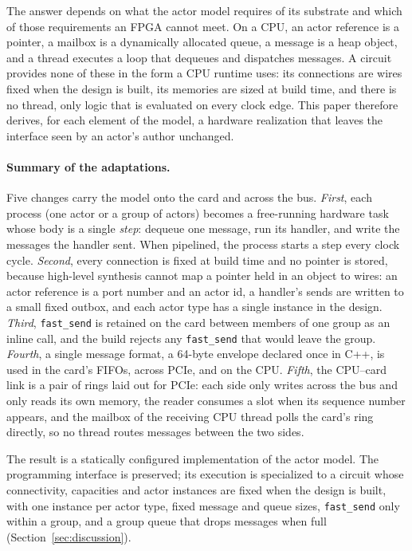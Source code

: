 \documentclass[11pt]{article}
\newcommand{\fs}{\texttt{fast\_send}}
\begin{document}
The answer depends on what the actor model requires of its substrate and which
of those requirements an FPGA cannot meet. On a CPU, an actor reference is a
pointer, a mailbox is a dynamically allocated queue, a message is a heap
object, and a thread executes a loop that dequeues and dispatches messages. A
circuit provides none of these in the form a CPU runtime uses: its connections
are wires fixed when the design is built, its memories are sized at build time,
and there is no thread, only logic that is evaluated on every clock edge. This paper therefore derives, for
each element of the model, a hardware realization that leaves the interface
seen by an actor's author unchanged.

\paragraph{Summary of the adaptations.}
Five changes carry the model onto the card and across the bus.
\emph{First}, each process (one actor or a group of actors) becomes a
free-running hardware task whose body is a single \emph{step}: dequeue one
message, run its handler, and write the messages the handler sent. When
pipelined, the process starts a step every clock cycle. \emph{Second}, every
connection is fixed at build time and no pointer is stored, because high-level
synthesis cannot map a pointer held in an object to wires: an actor reference
is a port number and an actor id, a handler's sends are written to a small
fixed outbox, and each actor type has a single instance in the design.
\emph{Third}, \fs{} is retained on the card between members of one group as an
inline call, and the build rejects any \fs{} that would leave the group.
\emph{Fourth}, a single message format, a 64-byte envelope declared once in
C++, is used in the card's FIFOs, across PCIe, and on the CPU. \emph{Fifth}, the
CPU--card link is a pair of rings laid out for PCIe: each side only writes
across the bus and only reads its own memory, the reader consumes a slot when
its sequence number appears, and the mailbox of the receiving CPU thread polls
the card's ring directly, so no thread routes messages between the two sides.

The result is a statically configured implementation of the actor model. The
programming interface is preserved; its execution is specialized to a circuit
whose connectivity, capacities and actor instances are fixed when the design is
built, with one instance per actor type, fixed message and queue sizes, \fs{}
only within a group, and a group queue that drops messages when full
(Section~\ref{sec:discussion}).
\end{document}
